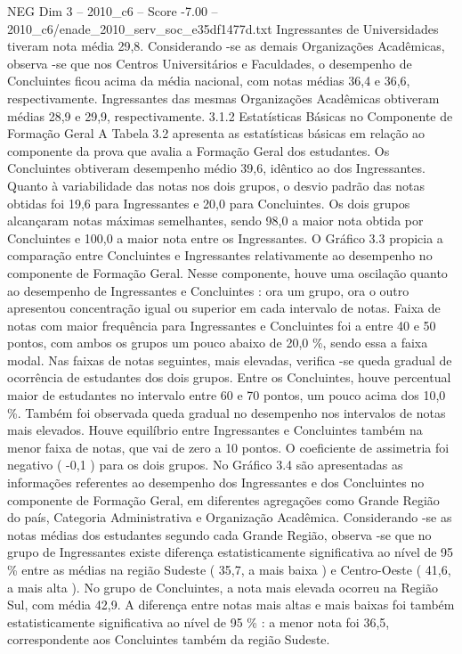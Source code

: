 \begin{textsample}{NEG Dim 3 – 2010\_c6 – Score -7.00 – 2010\_c6/enade\_2010\_serv\_soc\_e35df1477d.txt}
Ingressantes de Universidades tiveram nota média 29,8.
Considerando -se as demais Organizações Acadêmicas, observa -se que nos Centros Universitários e Faculdades, o desempenho de Concluintes ficou acima da média nacional, com notas médias 36,4 e 36,6, respectivamente.
Ingressantes das mesmas Organizações Acadêmicas obtiveram médias 28,9 e 29,9, respectivamente. 3.1.2 Estatísticas Básicas no Componente de Formação Geral A Tabela 3.2 apresenta as estatísticas básicas em relação ao componente da prova que avalia a Formação Geral dos estudantes.
Os Concluintes obtiveram desempenho médio 39,6, idêntico ao dos Ingressantes.
Quanto à variabilidade das notas nos dois grupos, o desvio padrão das notas obtidas foi 19,6 para Ingressantes e 20,0 para Concluintes.
Os dois grupos alcançaram notas máximas semelhantes, sendo 98,0 a maior nota obtida por Concluintes e 100,0 a maior nota entre os Ingressantes.
O Gráfico 3.3 propicia a comparação entre Concluintes e Ingressantes relativamente ao desempenho no componente de Formação Geral.
Nesse componente, houve uma oscilação quanto ao desempenho de Ingressantes e Concluintes : ora um grupo, ora o outro apresentou concentração igual ou superior em cada intervalo de notas.
Faixa de notas com maior frequência para Ingressantes e Concluintes foi a entre 40 e 50 pontos, com ambos os grupos um pouco abaixo de 20,0 \%, sendo essa a faixa modal.
Nas faixas de notas seguintes, mais elevadas, verifica -se queda gradual de ocorrência de estudantes dos dois grupos.
Entre os Concluintes, houve percentual maior de estudantes no intervalo entre 60 e 70 pontos, um pouco acima dos 10,0 \%.
Também foi observada queda gradual no desempenho nos intervalos de notas mais elevados.
Houve equilíbrio entre Ingressantes e Concluintes também na menor faixa de notas, que vai de zero a 10 pontos.
O coeficiente de assimetria foi negativo ( -0,1 ) para os dois grupos.
No Gráfico 3.4 são apresentadas as informações referentes ao desempenho dos Ingressantes e dos Concluintes no componente de Formação Geral, em diferentes agregações como Grande Região do país, Categoria Administrativa e Organização Acadêmica.
Considerando -se as notas médias dos estudantes segundo cada Grande Região, observa -se que no grupo de Ingressantes existe diferença estatisticamente significativa ao nível de 95 \% entre as médias na região Sudeste ( 35,7, a mais baixa ) e Centro-Oeste ( 41,6, a mais alta ).
No grupo de Concluintes, a nota mais elevada ocorreu na Região Sul, com média 42,9.
A diferença entre notas mais altas e mais baixas foi também estatisticamente significativa ao nível de 95 \% : a menor nota foi 36,5, correspondente aos Concluintes também da região Sudeste.

\end{textsample}
